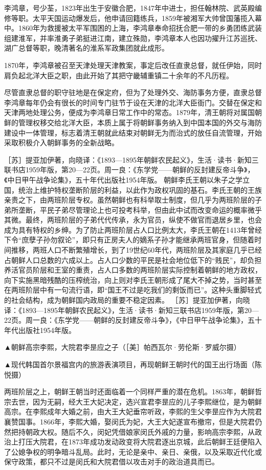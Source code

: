 \documentclass[12pt,UTF8]{ctexbook}
\begin{document}
李鸿章，号少荃，1823年出生于安徽合肥，1847年中进士，担任翰林院、武英殿编修等职。太平天国运动爆发后，他申请回籍练兵，1859年被湘军大帅曾国藩揽入幕中。1860年为救援被太平军围困的上海，李鸿章奉命招抚合肥一带的乡勇团练武装组建淮军，并率淮勇子弟挺进江南，建立殊勋，李鸿章本人也因功擢升江苏巡抚、湖广总督等职，晚清著名的淮系军政集团就此成形。

1870年，李鸿章被召至天津处理天津教案，事定后改任直隶总督，就任伊始，同时肩负起北洋大臣之职，由此开始了其把守畿辅重镇二十余年的不凡历程。

尽管直隶总督的职守驻地是在保定府，但为了处理外交、海防事务方便，直隶总督李鸿章每年仍会有很长的时间专门驻节于设在天津的北洋大臣衙门。交替在保定和天津两地处理公务，便成为李鸿章日常工作中的常态。1879年，清王朝将对属国朝鲜的管理权移交给北洋大臣，本质上属于将朝鲜事务纳入到中国本国的外交与海防建设中一体管理，标志着清王朝就此结束对朝鲜无为而治式的放任自流管理，开始采取积极介入朝鲜事务的全新战略。

［苏］提亚加伊著，向晓译：《1893—1895年朝鲜农民起义》，生活·读书·新知三联书店1959年版，第20—22页。周一良：《东学党——朝鲜的反封建反帝斗争》，《中日甲午战争论集》，五十年代出版社1954年版。
朝鲜李氏王朝以朱子之学立国，统治上维护特权垄断阶层的利益，以此作为政权巩固的基石。李氏王朝的王族亲贵之下，由两班阶层专权。虽然朝鲜也有科举取士制度，但几乎为两班阶层的子弟所垄断，平民子弟尽管理论上也可投考科举，但由此中试而改变命运的概率微乎其微。最终，两班阶层的子弟代代传承，永为官员，纵使不做官而退居乡里，也会成为具有特权的乡绅。为了防止两班阶层占人口比例太大，李氏王朝在1413年曾经下令“庶孽子孙勿叙论”，即只有正房夫人的嫡系子孙才能继承两班官身，但随着时间推移，两班人口不断繁殖增长，到了19世纪60年代，两班阶层及其家庭几乎已经占朝鲜人口总数的六成以上。占人口少数的平民是社会地位低下的“贱民”，却负担养活官员阶层和王室的重责，占人口多数的两班阶层实际控制着朝鲜的地方政权，向下实施黑暗残酷的压榨统治，向上则对李氏王朝形成了尾大不掉之势，当时甚至在两班阶层中有一句流行语，即“国王不过是吃我们的剩饭而已”。这种头重脚轻式的社会结构，成为朝鲜国内政局的重要不稳定因素。 ［苏］提亚加伊著，向晓译：《1893—1895年朝鲜农民起义》，生活·读书·新知三联书店1959年版，第20—22页。周一良：《东学党——朝鲜的反封建反帝斗争》，《中日甲午战争论集》，五十年代出版社1954年版。


▲朝鲜高宗李熙，大院君李昰应之子（［美］帕西瓦尔·劳伦斯·罗威尔摄）


▲现代韩国首尔景福宫内的旅游表演项目，再现朝鲜王朝时代的国王出行场面（陈悦摄）

两班阶层之上，朝鲜王朝当时还面临着一个同样严重的潜在危机。1863年，朝鲜哲宗去世，因为无嗣，经大王大妃决定，选兴宣君李昰应的儿子李熙继位，是为朝鲜高宗。在李熙成年大婚之前，由大王大妃垂帘听政，李熙的生父李昰应作为大院君襄赞国事。1866年，李熙大婚，娶闵氏为妃，大王大妃遂宣布撤帘，但是大院君仍然把持朝政大权。随后不久，闵妃凭借娘家闵氏外戚的力量，影响高宗李熙，从政治上打压大院君，在1873年成功发动政变将大院君逐出京城，此后朝鲜王廷便陷入了公媳争权的明争暗斗乱局。此时，无论是亲中、亲日、亲俄，以及采取近代化或保守政策，都只不过是闵氏和大院君借以攻击对手的政治道具而已。
\end{document}
